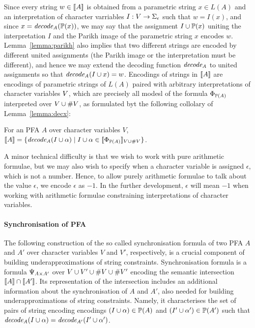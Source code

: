 \documentclass[sigplan,review,anonymous]{acmart}\settopmatter{printfolios=true,printccs=false,printacmref=false}
\begin{document}
Since every string $w \in [\![A]\!]$ is obtained from a parametric string $x\in L(A)$ and an interpretation of character varriables $I:V\rightarrow\Sigma_\epsilon$ such that $w = I(x)$, and since $x = \mathit{decode_{A}}(\mathbb{P}{(x)})$, 
we may say that the assignment $I \cup \mathbb{P}{(x)}$ uniting the interpretation $I$ and the Parikh image of the parametric string $x$ encodes $w$. Lemma~\ref{lemma:parikh} also implies that two different strings are encoded by different united assignments (the Parikh image or the interpretation must be different), and hence we may extend the decoding function $\mathit{decode_{A}}$ to united assignments so that $\mathit{decode_{A}}(I \cup x) = w$.
Encodings of strings in $[\![A]\!]$ are encodings of parametric strings of $L(A)$ paired with arbitrary interpretations of character variables $V$, which are precisely all modesl of the formula $\Phi_{\mathbb{P}{(A)}}$ interpreted over $V\cup\#{V}$, as formulated byt the following collolary of Lemma~\ref{lemma:decx}:
%
\begin{corollary}
For an PFA $A$ over character variables $V$,
$[\![A]\!] = \{\mathit{decode_{A}}(I\cup \alpha) \mid I\cup\alpha\in[\![\Phi_{\mathbb{P}{(A)}}]\!]_{V\cup\#{V}}\}$.
\end{corollary}
%
A minor technical difficulty is that we wish to work with pure arithmetic formulae, 
but we may also wish to specify when a character variable is assigned $\epsilon$, which is not a number. 
Hence, to allow purely arithmetic formulae to talk about the value $\epsilon$, we encode $\epsilon$ as $-1$.
In the further development, $\epsilon$ will mean $-1$ when working with arithmetic formulae constraining interpretations of character variables.

\paragraph{Synchronisation of PFA}
The following construction of the so called synchronisation formula of two PFA $A$ and $A'$ over character variables $V$ and $V'$, respectively, is a crucial component of building underapproximations of string constraints. 
Synchronisation formula is a formula $\Psi_{A \times A'}$ over $V\cup V' \cup \#{V}\cup\#{V'}$ encoding the semantic intersection $[\![A]\!] \cap [\![A']\!]$. Its representation of the intersection includes an additional information about the synchronisation of $A$ and ${A'}$, also needed for building underapproximations of string constraints. 
Namely, it characterises the set of pairs of string encoding encodings $(I\cup \alpha)\in \mathbb{P}{(A)}$ and $(I'\cup \alpha')\in\mathbb{P}{(A')}$ such that 
$\mathit{decode_{A}}(I\cup \alpha) = \mathit{decode_{A'}}(I'\cup \alpha')$.%
\end{document}
